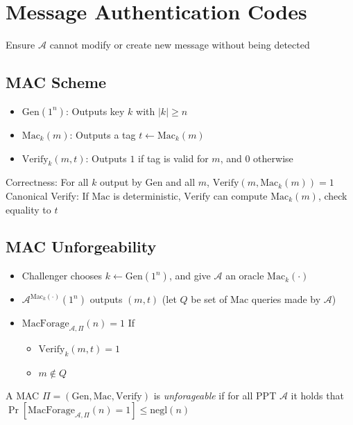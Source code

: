 \section{Message Authentication Codes}
Ensure $\mathcal{A}$ cannot modify or create new message without being detected

\subsection*{MAC Scheme}
\begin{itemize}
    \item $\text{Gen}(1^n)$: Outputs key $k$ with $|k|\ge n$
    \item $\text{Mac}_k(m)$: Outputs a tag $t\leftarrow \text{Mac}_k(m)$
    \item $\text{Verify}_k(m,t)$: Outputs $1$ if tag is valid for $m$, and $0$ otherwise
\end{itemize}

Correctness: For all $k$ output by $\text{Gen}$ and all $m$, $\text{Verify}(m,\text{Mac}_k(m))=1$\\

Canonical Verify: If $\text{Mac}$ is deterministic, $\text{Verify}$ can compute $\text{Mac}_k(m)$, check equality to $t$\\

\subsection*{MAC Unforgeability}
\begin{itemize}
    \item Challenger chooses $k\leftarrow \text{Gen}(1^n)$, and give $\mathcal{A}$ an oracle $\text{Mac}_k(\cdot)$
    \item $\mathcal{A}^{\text{Mac}_k(\cdot)}(1^n)$ outputs $(m,t)$ (let $Q$ be set of $\text{Mac}$ queries made by $\mathcal{A}$)
    \item $\text{MacForage}_{\mathcal{A},\Pi}(n)=1$ If \begin{itemize}
        \item $\text{Verify}_k(m,t)=1$
        \item $m\notin Q$
    \end{itemize}
\end{itemize}

A MAC $\Pi=(\text{Gen},\text{Mac},\text{Verify})$ is \emph{unforageable} if for all PPT $\mathcal{A}$ it holds that
$\Pr[\text{MacForage}_{\mathcal{A},\Pi}(n)=1]\le \text{negl}(n)$\\

